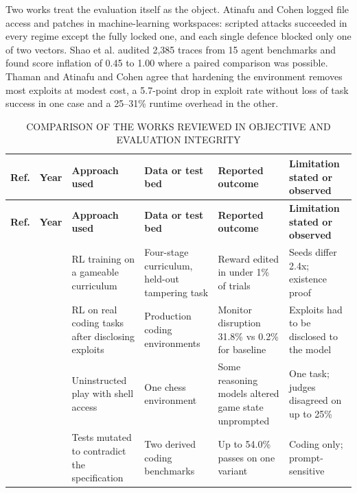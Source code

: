 Two works treat the evaluation itself as the object. Atinafu and Cohen \cite{r16} logged file access and patches in machine-learning workspaces: scripted attacks succeeded in every regime except the fully locked one, and each single defence blocked only one of two vectors. Shao et al. \cite{r17} audited 2,385 traces from 15 agent benchmarks and found score inflation of 0.45 to 1.00 where a paired comparison was possible. Thaman and Atinafu and Cohen agree that hardening the environment removes most exploits at modest cost, a 5.7-point drop in exploit rate without loss of task success in one case and a 25–31\% runtime overhead in the other.

\begingroup
\fontsize{9}{10.5}\selectfont
\setlength{\tabcolsep}{1.4mm}
\renewcommand{\arraystretch}{1.08}
\begin{longtable}{|>{\raggedright\arraybackslash}p{9.13mm}|>{\raggedright\arraybackslash}p{10.65mm}|>{\raggedright\arraybackslash}p{30.43mm}|>{\raggedright\arraybackslash}p{30.43mm}|>{\raggedright\arraybackslash}p{38.04mm}|>{\raggedright\arraybackslash}p{33.47mm}|}
\caption{COMPARISON OF THE WORKS REVIEWED IN OBJECTIVE AND EVALUATION INTEGRITY}\\
\hline
\rowcolor{navy}\color{white}\bfseries Ref. & \color{white}\bfseries Year & \color{white}\bfseries Approach used & \color{white}\bfseries Data or test bed & \color{white}\bfseries Reported outcome & \color{white}\bfseries Limitation stated or observed\\\hline
\endfirsthead
\hline
\textbf{Ref.} & \textbf{Year} & \textbf{Approach used} & \textbf{Data or test bed} & \textbf{Reported outcome} & \textbf{Limitation stated or observed}\\\hline
\endhead
\endfoot
\endlastfoot
\cite{r2} & 2024 & RL training on a gameable curriculum & Four-stage curriculum, held-out tampering task & Reward edited in under 1\% of trials & Seeds differ 2.4x; existence proof\\\hline
\cite{r11} & 2025 & RL on real coding tasks after disclosing exploits & Production coding environments & Monitor disruption 31.8\% vs 0.2\% for baseline & Exploits had to be disclosed to the model\\\hline
\cite{r12} & 2025 & Uninstructed play with shell access & One chess environment & Some reasoning models altered game state unprompted & One task; judges disagreed on up to 25\%\\\hline
\cite{r3} & 2025 & Tests mutated to contradict the specification & Two derived coding benchmarks & Up to 54.0\% passes on one variant & Coding only; prompt-sensitive\\\hline

\end{longtable}
